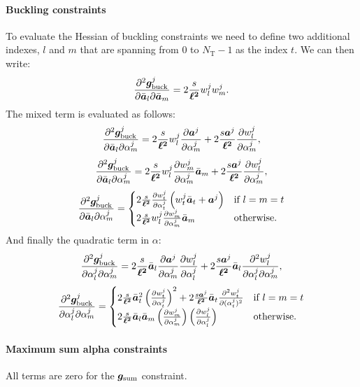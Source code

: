 \paragraph*{Buckling constraints}
To evaluate the Hessian of buckling constraints we need to define two additional indexes, $l$ and $m$ that are spanning from 0 to $N_\text{T}-1$ as the index $t$. We can then write:
\begin{equation}
    \frac{\partial^2\bm{g}_\text{buck}^j}{\partial\bar{\bm{a}}_l\partial\bar{\bm{a}}_m} = 2\frac{s}{\bm{\ell^2}} w_l^j w_m^j.
\end{equation}
The mixed term is evaluated as follows:
\begin{equation}
    \frac{\partial^2\bm{g}_\text{buck}^j}{\partial{\bar{\bm{a}}_l}\partial\alpha_m^j} =  2\frac{s}{\bm{\ell^2}} w_l^j \frac{\partial\bm{a}^j}{\partial\alpha^j_m} + 2\frac{s\bm{a}^j}{\bm{\ell^2}} \frac{\partial w_l^j}{\partial\alpha_m^j},
\end{equation}
\begin{equation}
    \frac{\partial^2\bm{g}_\text{buck}^j}{\partial{\bar{\bm{a}}_l}\partial\alpha_m^j} = 2\frac{s}{\bm{\ell^2}}w_l^j \frac{\partial w_m^j}{\partial\alpha_m^j}  \bar{\bm{a}}_m + 2\frac{s\bm{a}^j}{\bm{\ell^2}} \frac{\partial w_l^j}{\partial\alpha_m^j},
\end{equation}
\begin{equation}
    \frac{\partial^2\bm{g}_\text{buck}^j}{\partial{\bar{\bm{a}}_l}\partial\alpha_m^j}=
    \begin{cases}
         2\frac{s}{\bm{\ell^2}} \frac{\partial w_t^j}{\partial\alpha_t^j}\left( w_t^j \bar{\bm{a}}_t + \bm{a}^j \right) & \text{if }l=m=t \\
         2\frac{s}{\bm{\ell^2}}w_l^j \frac{\partial w_m^j}{\partial\alpha_m^j}  \bar{\bm{a}}_m & \text{otherwise.}
        
    \end{cases}
\end{equation}
And finally the quadratic term in $\alpha$:
\begin{equation}
    \frac{\partial^2\bm{g}_\text{buck}^j}{\partial\alpha^j_l\partial\alpha^j_m} =  2\frac{s}{\bm{\ell^2}}\bar{\bm{a}}_l \frac{\partial\bm{a}^j}{\partial\alpha^j_m} \frac{\partial w_l^j}{\partial\alpha^j_l} + 2\frac{s\bm{a}^j}{\bm{\ell^2}}\bar{\bm{a}}_l \frac{\partial^2w_l^j}{\partial\alpha^j_l\partial\alpha^j_m},
\end{equation}
\begin{equation}
    \frac{\partial^2\bm{g}_\text{buck}^j}{\partial\alpha^j_l\partial\alpha^j_m} = 
    \begin{cases}
        2\frac{s}{\bm{\ell^2}}\bar{\bm{a}}_t^2\left(\frac{\partial w_t^j}{\partial\alpha_t^j}\right)^2  + 2\frac{s\bm{a}^j}{\bm{\ell^2}}\bar{\bm{a}}_t \frac{\partial^2w_t^j}{\partial(\alpha^j_t)^2} & \text{if }l=m=t\\
        2\frac{s}{\bm{\ell^2}}\bar{\bm{a}}_l\bar{\bm{a}}_m\left(\frac{\partial w_m^j}{\partial\alpha_m^j}\right) \left(\frac{\partial w_l^j}{\partial\alpha_l^j}\right)
         & \text{otherwise.}
    \end{cases}
\end{equation}
\paragraph*{Maximum sum alpha constraints}
All terms are zero for the $\bm{g}_\text{sum}$ constraint.